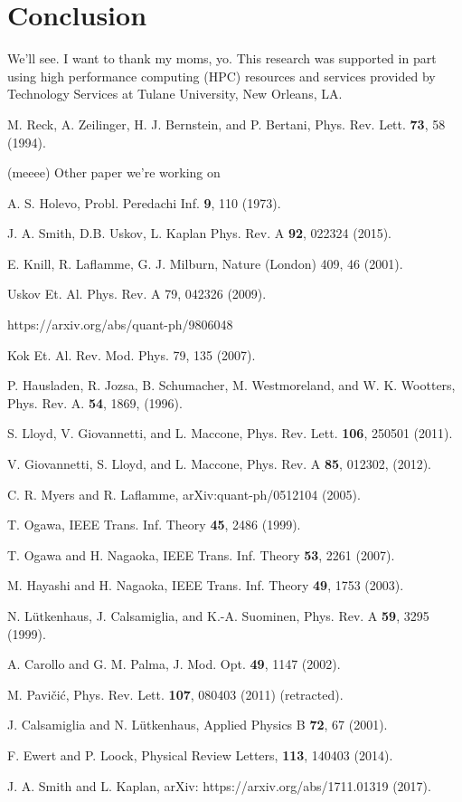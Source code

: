 \documentclass[aps,pra,twocolumn,showpacs,superscriptaddress,floatfix,10pt]{revtex4}
\begin{document}
\section{Conclusion}
We'll see.
\acknowledgments
I want to thank my moms, yo. This research was supported in part using high performance computing (HPC) resources and services provided by Technology Services at Tulane University, New Orleans, LA.
\begin{thebibliography}{99}

 M. Reck, A. Zeilinger, H. J. Bernstein, and P. Bertani, Phys. Rev. Lett. {\bf 73}, 58 (1994).

 (meeee) Other paper we're working on

 A. S. Holevo, Probl. Peredachi Inf. \textbf{9}, 110 (1973).	

 J. A. Smith, D.B. Uskov, L. Kaplan Phys. Rev. A \textbf{92}, 022324 (2015).

  E. Knill, R. Laflamme, G. J. Milburn, Nature (London) 409, 46 (2001).

 Uskov Et. Al.
Phys. Rev. A 79, 042326 (2009).

 https://arxiv.org/abs/quant-ph/9806048

 Kok Et. Al.
Rev. Mod. Phys. 79, 135 (2007).

 P. Hausladen, R. Jozsa, B. Schumacher, M. Westmoreland, and W. K. Wootters, Phys. Rev. A. \textbf{54}, 1869, (1996).

 S. Lloyd, V. Giovannetti, and L. Maccone, Phys. Rev. Lett. \textbf{106}, 250501 (2011).

 V. Giovannetti, S. Lloyd, and L. Maccone, Phys. Rev. A \textbf{85}, 012302, (2012).

 C. R. Myers and R. Laflamme, arXiv:quant-ph/0512104 (2005).

 T. Ogawa, IEEE Trans. Inf. Theory \textbf{45}, 2486 (1999).

 T. Ogawa and H. Nagaoka, IEEE Trans. Inf. Theory \textbf{53}, 2261 (2007).

 M. Hayashi and H. Nagaoka, IEEE Trans. Inf. Theory \textbf{49}, 1753 (2003).

 N. L\"utkenhaus, J. Calsamiglia, and K.-A. Suominen, Phys. Rev. A {\bf 59}, 3295 (1999).

 A. Carollo and G. M. Palma, J. Mod. Opt. {\bf 49}, 1147 (2002).

 M. Pavi\v{c}i\'c, Phys. Rev. Lett. {\bf 107}, 080403 (2011) (retracted).

 J. Calsamiglia and N. L\"utkenhaus, Applied Physics B {\bf 72}, 67 (2001).

 F. Ewert and P. Loock, Physical Review Letters, {\bf 113}, 140403 (2014).

 J. A. Smith and L. Kaplan, arXiv: https://arxiv.org/abs/1711.01319 (2017).

\end{thebibliography}
\end{document}
